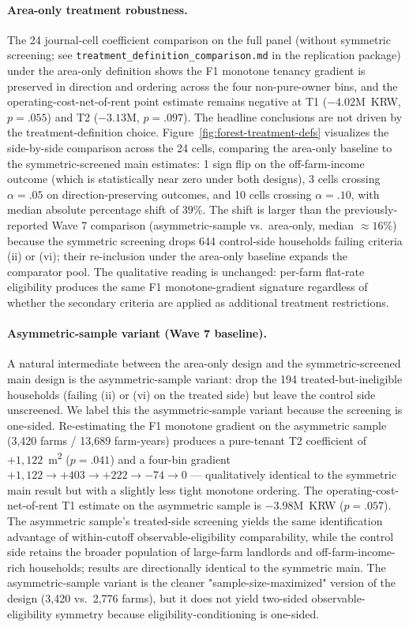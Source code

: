 \documentclass[12pt, a4paper]{article}
\begin{document}
\paragraph{Area-only treatment robustness.} The 24 journal-cell coefficient comparison on the full panel (without symmetric screening; see \texttt{treatment\_definition\_comparison.md} in the replication package) under the area-only definition shows the F1 monotone tenancy gradient is preserved in direction and ordering across the four non-pure-owner bins, and the operating-cost-net-of-rent point estimate remains negative at T1 ($-4.02$M~KRW, $p = .055$) and T2 ($-3.13$M, $p = .097$). The headline conclusions are not driven by the treatment-definition choice. Figure~\ref{fig:forest-treatment-defs} visualizes the side-by-side comparison across the 24 cells, comparing the area-only baseline to the symmetric-screened main estimates: 1 sign flip on the off-farm-income outcome (which is statistically near zero under both designs), 3 cells crossing $\alpha = .05$ on direction-preserving outcomes, and 10 cells crossing $\alpha = .10$, with median absolute percentage shift of $39\%$. The shift is larger than the previously-reported Wave 7 comparison (asymmetric-sample vs.\ area-only, median $\approx 16\%$) because the symmetric screening drops 644 control-side households failing criteria (ii) or (vi); their re-inclusion under the area-only baseline expands the comparator pool. The qualitative reading is unchanged: per-farm flat-rate eligibility produces the same F1 monotone-gradient signature regardless of whether the secondary criteria are applied as additional treatment restrictions.

\paragraph{Asymmetric-sample variant (Wave 7 baseline).}\label{sec:robustness-asymmetric} A natural intermediate between the area-only design and the symmetric-screened main design is the asymmetric-sample variant: drop the 194 treated-but-ineligible households (failing (ii) or (vi) on the treated side) but leave the control side unscreened. We label this the asymmetric-sample variant because the screening is one-sided. Re-estimating the F1 monotone gradient on the asymmetric sample (3,420 farms / 13,689 farm-years) produces a pure-tenant T2 coefficient of $+1{,}122$~m\textsuperscript{2} ($p = .041$) and a four-bin gradient $+1{,}122 \to +403 \to +222 \to -74 \to 0$ --- qualitatively identical to the symmetric main result but with a slightly less tight monotone ordering. The operating-cost-net-of-rent T1 estimate on the asymmetric sample is $-3.98$M~KRW ($p = .057$). The asymmetric sample's treated-side screening yields the same identification advantage of within-cutoff observable-eligibility comparability, while the control side retains the broader population of large-farm landlords and off-farm-income-rich households; results are directionally identical to the symmetric main. The asymmetric-sample variant is the cleaner "sample-size-maximized" version of the design (3,420 vs.\ 2,776 farms), but it does not yield two-sided observable-eligibility symmetry because eligibility-conditioning is one-sided.
\end{document}
